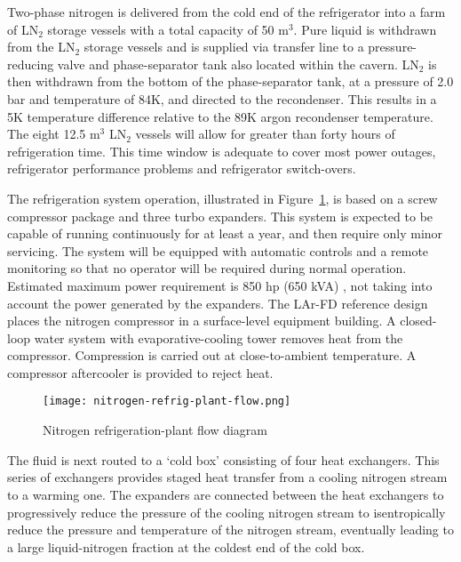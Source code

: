 Two-phase nitrogen is delivered from the cold end of the refrigerator into a farm of  LN$_2$ storage vessels with a total capacity of 50 m$^3$. Pure liquid is withdrawn from the  LN$_2$ storage vessels and is supplied via transfer line to a pressure-reducing valve and phase-separator tank also located within the cavern.  LN$_2$ is then withdrawn from the bottom of the phase-separator tank, at a pressure of 2.0 bar and temperature of 84K, and directed to the recondenser. This results in a 5K temperature difference relative to the 89K argon recondenser temperature. The eight 12.5 m$^3$ LN$_2$ vessels will allow for greater than forty hours of refrigeration time. This time window is adequate to cover most power outages, refrigerator performance problems and refrigerator switch-overs.



The refrigeration system operation, illustrated in Figure~\ref{fig:LN2-refrigerator-flow}, is based on a screw compressor package and three turbo expanders. This system is expected to be capable of running  
continuously for at least a year, and then require only minor servicing. The system will be equipped with 
automatic controls and a remote monitoring so that no operator will be required during normal operation. 
Estimated maximum power requirement is 850 hp (650 kVA) , not taking into account the power generated by the expanders.  The LAr-FD reference design places the nitrogen compressor  in a surface-level equipment building. A closed-loop water system with evaporative-cooling tower removes heat from the compressor. Compression is carried out at close-to-ambient temperature. A compressor aftercooler is provided to reject heat. 

\begin{figure}[htbp]
\centering
\texttt{[image: nitrogen-refrig-plant-flow.png]}
\caption{Nitrogen refrigeration-plant flow diagram}
\label{fig:LN2-refrigerator-flow}
\end{figure}

The fluid is next routed to a `cold box' consisting of four heat exchangers.  This series of exchangers provides staged heat transfer from a cooling nitrogen stream to a warming one.  The expanders are connected between the heat exchangers to progressively reduce the pressure of the cooling nitrogen stream to isentropically reduce the pressure and temperature of the
nitrogen stream, eventually leading to a large liquid-nitrogen fraction at the coldest end of the cold box. 

